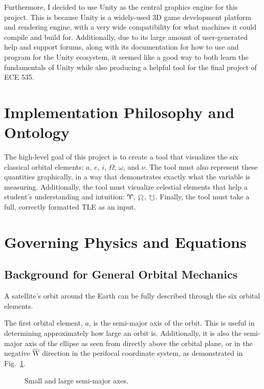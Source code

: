 \documentclass[conference]{IEEEtran}
\newcommand{\vhat}[1]{\hat{\bm{\mathrm{#1}}}}
\begin{document}
			Furthermore, I decided to use Unity as the central graphics engine for this project. This is because Unity is a widely-used 3D game development platform and rendering engine, with a very wide compatibility for what machines it could compile and build for. Additionally, due to its large amount of user-generated help and support forums, along with its documentation for how to use and program for the Unity ecosystem, it seemed like a good way to both learn the fundamentals of Unity while also producing a helpful tool for the final project of ECE 535.

	\section{Implementation Philosophy and Ontology}
		The high-level goal of this project is to create a tool that visualizes the six classical orbital elements: \( a \), \( e \), \( i \), \( \Omega \), \( \omega \), and \( \nu \). The tool must also represent these quantities graphically, in a way that demonstrates exactly what the variable is measuring. Additionally, the tool must visualize celestial elements that help a student's understanding and intuition: \( \aries \), \( \ascnode \), \( \descnode \). Finally, the tool must take a full, correctly formatted TLE as an input.

	\section{Governing Physics and Equations}

		\subsection{Background for General Orbital Mechanics}
			A satellite's orbit around the Earth can be fully described through the six orbital elements. 

			The first orbital element, \( a \), is the semi-major axis of the orbit. This is useful in determining approximately how large an orbit is. Additionally, it is also the semi-major axis of the ellipse as seen from directly above the orbital plane, or in the negative \( \vhat{W} \) direction in the perifocal coordinate system, as demonstrated in Fig.~\ref{figA}.

			\begin{figure}[hbtp]
				\begin{center}
				\end{center}
				\caption{Small and large semi-major axes.}
				\label{figA}
			\end{figure}
\end{document}
